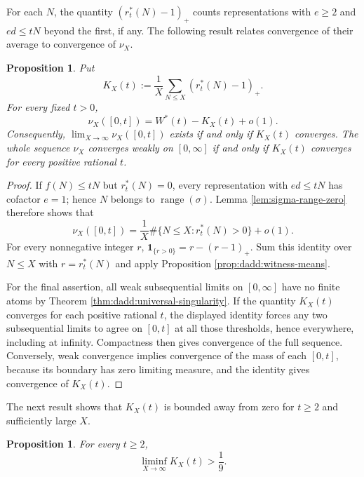 \documentclass[11pt,letterpaper,reqno]{amsart}
\numberwithin{equation}{section}
\newtheorem{proposition}[theorem]{Proposition}
\theoremstyle{remark}
\renewcommand{\leq}{\leqslant}
\renewcommand{\geq}{\geqslant}
\begin{document}
For each $N$, the quantity $(r_t^*(N)-1)_+$ counts representations with
$e\geq2$ and $ed\leq tN$ beyond the first, if any. The following result
relates convergence of their average to convergence of $\nu_X$.

\begin{proposition}
\label{prop:dadd:collision-criterion}
Put
\[
 K_X(t):=\frac1X\sum_{N\leq X}(r_t^*(N)-1)_+.
\]
For every fixed $t>0$,
\begin{equation}
\label{eq:dadd:collision-criterion}
 \nu_X([0,t])=W^*(t)-K_X(t)+o(1).
\end{equation}
Consequently, $\lim_{X\to\infty}\nu_X([0,t])$ exists if and only if
$K_X(t)$ converges.
The whole sequence $\nu_X$ converges weakly on $[0,\infty]$ if and only
if $K_X(t)$ converges for every positive rational $t$.
\end{proposition}

\begin{proof}
If $f(N)\leq tN$ but $r_t^*(N)=0$, every representation with
$ed\leq tN$ has cofactor $e=1$; hence
$N$ belongs to $\operatorname{range}(\sigma)$. Lemma
\ref{lem:sigma-range-zero} therefore shows that
\[
 \nu_X([0,t])
 =\frac1X\#\{N\leq X:r_t^*(N)>0\}+o(1).
\]
For every nonnegative integer $r$,
$\boldsymbol1_{\{r>0\}}=r-(r-1)_+$. Sum this identity over
$N\leq X$ with $r=r_t^*(N)$ and apply
Proposition \ref{prop:dadd:witness-means}.

For the final assertion, all weak subsequential limits on $[0,\infty]$ have no
finite atoms by Theorem \ref{thm:dadd:universal-singularity}. If the
quantity $K_X(t)$ converges for each positive rational $t$, the
displayed identity forces any two subsequential limits to agree on
$[0,t]$ at all those thresholds, hence everywhere, including at infinity.
Compactness then gives convergence of the full sequence. Conversely,
weak convergence implies convergence of the mass of each $[0,t]$,
because its boundary has zero limiting measure, and the identity gives
convergence of $K_X(t)$.
\end{proof}

The next result shows that $K_X(t)$ is bounded away from zero for $t\geq2$ and sufficiently large $X$.

\begin{proposition}
For every $t\geq2$,
\[
 \liminf_{X\to\infty}K_X(t)>\frac19.
\]
\end{proposition}
\end{document}
